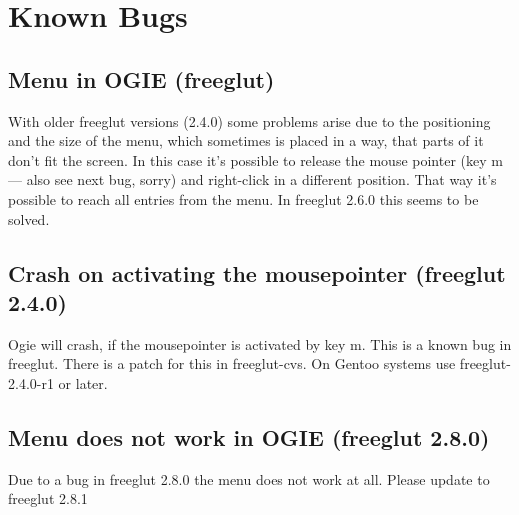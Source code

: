 

\section{Known Bugs}
\label{bugs}


\subsection*{Menu in OGIE (freeglut)}
With older freeglut versions (2.4.0) some problems arise due to the positioning and the size of the
menu, which sometimes is placed in a way, that parts of it don't fit the screen.
In this case it's possible to release the mouse pointer (key m --- also see next bug, sorry) and right-click in a different position. That way it's possible to reach all entries from the menu.
In freeglut 2.6.0 this seems to be solved.

\subsection*{Crash on activating the mousepointer (freeglut 2.4.0)}
Ogie will crash, if the mousepointer is activated by key m. This is a known bug in freeglut.
There is a patch for this in freeglut-cvs. On Gentoo systems use freeglut-2.4.0-r1 or later.

\subsection*{Menu does not work in OGIE (freeglut 2.8.0)}
Due to a bug in freeglut 2.8.0 the menu does not work at all.
Please update to freeglut 2.8.1


